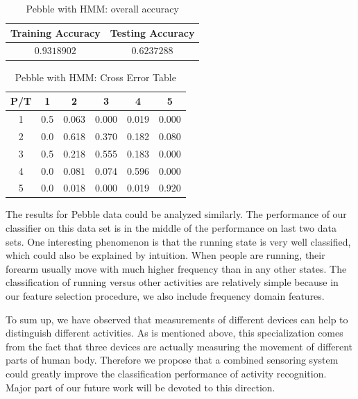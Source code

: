 \begin{itemize}
\begin{table}[!htb]
\begin{center}
\begin{tabular}{c|c}
      \hline
      Training Accuracy & Testing Accuracy\\
      \hline
      $0.9318902$ & $ 0.6237288$ \\
      \hline
\end{tabular}
\caption{Pebble with HMM: overall accuracy}
\label{tab:pebbleHMM1}
\end{center}
\end{table}
\begin{table}[!htb]
\begin{center}
\begin{tabular}{c|c|c|c|c|c}
      \hline
      P/T& 1 & 2 &3 & 4 & 5 \\
      \hline
      1 &0.5&0.063&0.000&0.019&0.000\\
      2 &0.0&0.618&0.370&0.182&0.080\\
      3 &0.5&0.218&0.555&0.183&0.000\\
      4 &0.0&0.081&0.074&0.596&0.000\\
      5 &0.0&0.018&0.000&0.019&0.920\\
      \hline
\end{tabular}
\caption{Pebble with HMM: Cross Error Table}
\label{tab:pebbleHMM2}
\end{center}
\end{table}
\end{itemize}

The results for Pebble data could be analyzed similarly. The performance of our classifier on this data set is in the middle of the performance on last two data sets. One interesting phenomenon is that the running state is very well classified, which could also be explained by intuition. When people are running, their forearm usually move with much higher frequency than in any other states. The classification of running versus other activities are relatively simple because in our feature selection procedure, we also include frequency domain features. 

To sum up, we have observed that measurements of different devices can help to distinguish different activities. As is mentioned above, this specialization comes from the fact that three devices are actually measuring the movement of different parts of human body. Therefore we propose that a combined sensoring system could greatly improve the classification performance of activity recognition. Major part of our future work will be devoted to this direction. 


